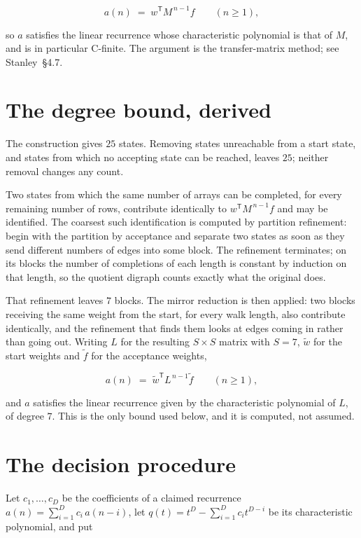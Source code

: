 \documentclass[11pt]{article}
\theoremstyle{definition}
\begin{document}
\[a(n) \;=\; w^{\mathsf T} M^{\,n-1} f \qquad (n \ge 1),\]

so $a$ satisfies the linear recurrence whose characteristic polynomial is that of $M$, and is in particular C-finite. The argument is the transfer-matrix method; see Stanley~\S4.7.

\section{The degree bound, derived}

The construction gives $25$ states. Removing states unreachable from a start state, and states from which no accepting state can be reached, leaves $25$; neither removal changes any count.

Two states from which the same number of arrays can be completed, for every remaining number of rows, contribute identically to $w^{\mathsf T}M^{\,n-1}f$ and may be identified. The coarsest such identification is computed by partition refinement: begin with the partition by acceptance and separate two states as soon as they send different numbers of edges into some block. The refinement terminates; on its blocks the number of completions of each length is constant by induction on that length, so the quotient digraph counts exactly what the original does.

That refinement leaves $7$ blocks. The mirror reduction is then applied: two blocks receiving the same weight from the start, for every walk length, also contribute identically, and the refinement that finds them looks at edges coming in rather than going out. Writing $L$ for the resulting $S \times S$ matrix with $S = 7$, $\tilde w$ for the start weights and $\tilde f$ for the acceptance weights,

\[a(n) \;=\; \tilde w^{\mathsf T} L^{\,n-1} \tilde f \qquad (n \ge 1),\]

and $a$ satisfies the linear recurrence given by the characteristic polynomial of $L$, of degree $7$. This is the only bound used below, and it is computed, not assumed.

\section{The decision procedure}

Let $c_1,\dots,c_D$ be the coefficients of a claimed recurrence $a(n) = \sum_{i=1}^{D} c_i\,a(n-i)$, let $q(t) = t^{D} - \sum_{i=1}^{D} c_i t^{D-i}$ be its characteristic polynomial, and put
\end{document}
